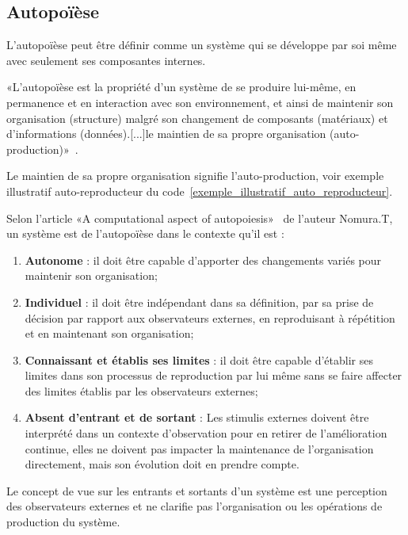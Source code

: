 \subsection{Autopoïèse}

L'autopoïèse peut être définir comme un système qui se développe par soi même avec seulement ses composantes internes.

«L'autopoïèse est la propriété d'un système de se produire lui-même, en permanence et en interaction avec son environnement, et ainsi de maintenir son organisation (structure) malgré son changement de composants (matériaux) et d'informations (données).[...]le maintien de sa propre organisation (auto-production)»~\cite{wiki_autopoiesis_2022}.

Le maintien de sa propre organisation signifie l'auto-production, voir exemple illustratif auto-reproducteur du code~\ref{exemple_illustratif_auto_reproducteur}.

Selon l'article «A computational aspect of autopoiesis»~\cite{tatsuya_computational_autopoiesis_2000} de l'auteur Nomura.T, un système est de l'autopoïèse dans le contexte qu'il est : 
\begin{enumerate}
    \item \textbf{Autonome} : il doit être capable d'apporter des changements variés pour maintenir son organisation;
    \item \textbf{Individuel} : il doit être indépendant dans sa définition, par sa prise de décision par rapport aux observateurs externes, en reproduisant à répétition et en maintenant son organisation;
    \item \textbf{Connaissant et établis ses limites} : il doit être capable d'établir ses limites dans son processus de reproduction par lui même sans se faire affecter des limites établis par les observateurs externes;
    \item \textbf{Absent d'entrant et de sortant} : Les stimulis externes doivent être interprété dans un contexte d'observation pour en retirer de l'amélioration continue, elles ne doivent pas impacter la maintenance de l'organisation directement, mais son évolution doit en prendre compte.
\end{enumerate}

Le concept de vue sur les entrants et sortants d'un système est une perception des observateurs externes et ne clarifie pas l'organisation ou les opérations de production du système. 


